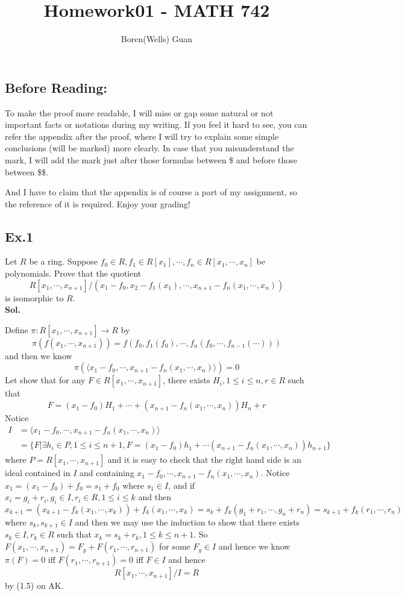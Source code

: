 \documentclass[lang=en,11pt,a4paper,citestyle =authoryear]{elegantpaper}
\title{Homework01 - MATH 742}
\author{Boren(Wells) Guan}
\begin{document}
\maketitle

\subsection*{Before Reading:}\par
To make the proof more readable, I will miss or gap some natural or not important facts or notations during my writing. If you feel it hard to see, you can refer the appendix after the proof, where I will try to explain some simple conclusions (will be marked) more clearly. In case that you misunderstand the mark, I will add the mark just after those formulas between \$ and before those between \$\$.\par
And I have to claim that the appendix is of course a part of my assignment, so the reference of it is required. Enjoy your grading!

\subsection*{Ex.1} 
Let $R$ be a ring. Suppose $f_0\in R, f_1\in R[x_1],\cdots,f_n \in R[x_1,\cdots,x_n]$ be polynomials. Prove that the quotient
\[
R[x_1,\cdots,x_{n+1}]/(x_1-f_0,x_2-f_1(x_1),\cdots,x_{n+1}-f_n(x_1,\cdots,x_n))
\]
is isomorphic to $R$.
\vspace{0.5em}\\
\textbf{Sol.} \par
Define $\pi:R[x_1,\cdots,x_{n+1}] \to R$ by \[\pi(f(x_1,\cdots,x_{n+1})) = f(f_0,f_1(f_0),\cdots,f_{n}(f_0,\cdots,f_{n-1}(\cdots)))\]
and then we know
\[
\pi(\langle x_1-f_0,\cdots,x_{n+1}-f_n(x_1,\cdots,x_n)\rangle) = 0
\]
Let show that for any $F\in R[x_1,\cdots,x_{n+1}]$, there exists $H_i, 1\leq i\leq n,r\in R$ such that \[F = (x_1-f_0)H_1+\cdots+(x_{n+1}-f_n(x_1,\cdots,x_n))H_n+r\]
Notice
\[
\begin{aligned}
    I & = \langle x_1-f_0,\cdots,x_{n+1}-f_n(x_1,\cdots,x_n)\rangle\\ &= \{
F|\exists h_i\in P, 1\leq i\leq n+1, F = (x_1-f_0)h_1 + \cdots (x_{n+1}-f_n(x_1,\cdots,x_n))h_{n+1}
\}
\end{aligned}
\]
where $P = R[x_1,\cdots,x_{n+1}]$ and it is easy to check that the right hand side is an ideal contained in $I$ and containing $x_1-f_0,\cdots,x_{n+1}-f_n(x_1,\cdots,x_n)$. Notice $x_1 = (x_1-f_0)+f_0 = s_1 + f_0$ where $s_1\in I$, and if $x_i = g_i+r_i, g_i\in I, r_i\in R,1\leq i\leq k$ and then $x_{k+1} = (x_{k+1}-f_k(x_1,\cdots,x_k)) + f_k(x_1,\cdots,x_k) = s_k + f_k(g_1+r_1,\cdots,g_n+r_n) = s_{k+1}+f_k(r_1,\cdots,r_n)$ where $s_k,s_{k+1}\in I$ and then we may use the induction to show that there exists $s_k\in I,r_k\in R$ such that $x_k = s_k+r_k, 1\leq k\leq n+1$. So $F(x_1,\cdots,x_{n+1}) = F_g+F(r_1,\cdots,r_{n+1})$ for some $F_g\in I$ and hence we know $\pi(F) = 0$ iff $F(r_1,\cdots,r_{n+1}) = 0$ iff $F\in I$ and hence
\[
R[x_1,\cdots,x_{n+1}]/I = R
\]
by (1.5) on AK. 
\par 
\vspace{0.5em}
\end{document}
